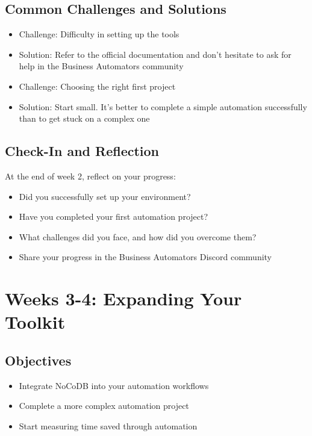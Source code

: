 \subsection{Common Challenges and Solutions}
\begin{itemize}
    \item Challenge: Difficulty in setting up the tools
    \item Solution: Refer to the official documentation and don't hesitate to ask for help in the Business Automators community

    \item Challenge: Choosing the right first project
    \item Solution: Start small. It's better to complete a simple automation successfully than to get stuck on a complex one
\end{itemize}

\subsection{Check-In and Reflection}
At the end of week 2, reflect on your progress:

\begin{itemize}
    \item Did you successfully set up your environment?
    \item Have you completed your first automation project?
    \item What challenges did you face, and how did you overcome them?
    \item Share your progress in the Business Automators Discord community
\end{itemize}

\section{Weeks 3-4: Expanding Your Toolkit}

\subsection{Objectives}
\begin{itemize}
    \item Integrate NoCoDB into your automation workflows
    \item Complete a more complex automation project
    \item Start measuring time saved through automation
\end{itemize}

